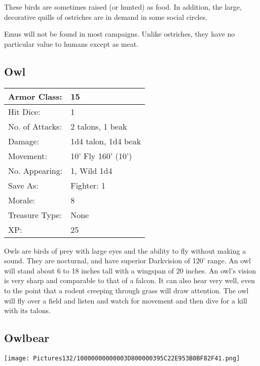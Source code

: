 \documentclass[a4paper,twoside,openany,10pt]{book}
\begin{document}
\begin{multicols}{2}
These birds are sometimes raised (or hunted) as food. In addition, the large, decorative quills of ostriches are in demand in some social
circles.

Emus will not be found in most campaigns. Unlike ostriches, they have no particular value to humans except as meat.

\subsection*{Owl}\label{owl}

\begin{tabularx}{0.50\textwidth}{@{}lX@{}}
Armor Class: & 15 \\\hline
Hit Dice: & 1 \\\hline
No. of Attacks: & 2 talons, 1 beak \\\hline
Damage: & 1d4 talon, 1d4 beak \\\hline
Movement: & 10' Fly 160' (10') \\\hline
No. Appearing: & 1, Wild 1d4 \\\hline
Save As: & Fighter: 1 \\\hline
Morale: & 8 \\\hline
Treasure Type: & None \\\hline
XP: & 25 \\\hline
\end{tabularx}\medskip

Owls are birds of prey with large eyes and the ability to fly without making a sound. They are nocturnal, and have superior Darkvision of 120' range. An owl will stand about 6 to 18 inches tall with a wingspan of 20 inches. An owl's vision is very sharp and comparable to that of a falcon. It can also hear very well, even to the point that a rodent creeping through grass will draw attention. The owl will fly over a field and listen and watch for movement and then dive for a kill with its talons.

\subsection*{Owlbear}\label{owlbear}


\begin{center} \texttt{[image: Pictures132/10000000000003D800000395C22E953B0BF82F41.png]} \end{center}


\end{multicols}
\end{document}
